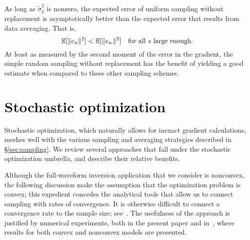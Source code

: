 \documentclass[nospthms]{svjour3}
\numberwithin{equation}{section}
\def\norm#1{\|#1\|}
\def\sigmatilde{\widetilde\sigma}
\def\expval{\mathbb{E}}
\begin{document}
As long as $\sigmatilde_g^2$ is nonzero, the expected error of uniform
sampling without replacement is asymptotically better than the
expected error that results from data averaging. That is,
\[
  \expval[\norm{e_n}^2] < \expval[\norm{e_w}^2]
  \quad
  \hbox{for all $s$ large enough.}
\]
At least as measured by the second moment of the
error in the gradient, the simple random sampling without replacement
has the benefit of yielding a good estimate when compared to these
other sampling schemes.





























































\section{Stochastic optimization}
\label{sec:semistochastic}

Stochastic optimization, which naturally allows for inexact
gradient calculations, meshes well with the various sampling
and averaging strategies described in \S\ref{sec:sampling}. We review
several approaches that fall under the stochastic optimization
umbrella, and describe their relative benefits.

Although the full-waveform inversion application that we consider is
nonconvex, the following discussion make the assumption that the
optimization problem is convex; this expedient concedes the analytical
tools that allow us to connect sampling with rates of convergence. It
is otherwise difficult to connect a convergence rate to the sample
size; see~\cite[\S2.3]{FS:2011}.  The usefulness of the approach is
justified by numerical experiments, both in the present paper and
in~\cite[\S5]{FS:2011}, where results for both convex and nonconvex
models are presented.
\end{document}
